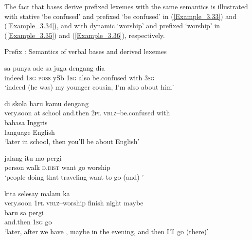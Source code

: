 The fact that  bases derive prefixed lexemes with the same semantics is illustrated with stative  ‘be confused’ and prefixed  ‘be confused’ in (\ref{Example_3.33}) and (\ref{Example_3.34}), and with dynamic  ‘worship’ and prefixed  ‘worship’ in (\ref{Example_3.35}) and (\ref{Example_3.36}), respectively.



\begin{styleExampleTitle}
{Prefix : Semantics of verbal bases and derived lexemes}
\end{styleExampleTitle}

\ea
\label{Example_3.33}
 {sa} {punya} {ade} {sa} {juga} {} {dengang} {dia}\\ %
 indeed  \textsc{1sg}  \textsc{poss}  ySb  \textsc{1sg}  also  be.confused  with  \textsc{3sg}\\
\glt 
‘indeed (he was) my younger cousin, I’m also  about him’ \textstyleExampleSource{[080918-001-CvNP.0014]}
\z

 

\ea
\label{Example_3.34}
 {di} {skola} {baru} {kamu} {} {dengang}\\ %
 {very.soon}  at  school  and.then  \textsc{2pl}  \textsc{vblz}–be.confused  with\\

 bahasa  {Inggris}\\

 language  {English}\\

 ‘later in school, then you’ll be  about English’ \textstyleExampleSource{[081115-001a-Cv.0151]}
\z

\ea
\label{Example_3.35}
 {jalang} {itu} {mo} {pergi} {}\\ %
 person  walk  \textsc{d.dist}  want  go  worship\\
 ‘people doing that traveling want to go (and) ’ \textstyleExampleSource{[081006-016-Cv.0017]}
\z

\ea
\label{Example_3.36}
 {{kita}} {} {selesay} {malam} {ka}\\ %
 {very.soon}  {\textsc{1pl}}  \textsc{vblz}–worship  finish  night  maybe\\
\gll baru  {sa}  {pergi}\\
 and.then  {\textsc{1sg}}  {go}\\
\glt 
‘later, after we have , maybe in the evening, and then I’ll go (there)’ \textstyleExampleSource{[080918-001-CvNP.0016]}
\z

